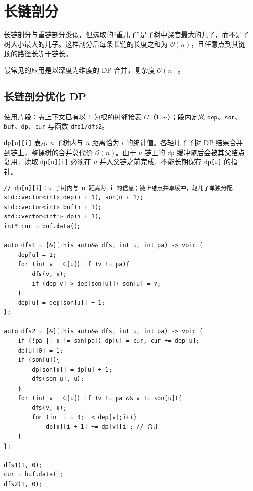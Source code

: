 \section{长链剖分}

长链剖分与重链剖分类似，但选取的“重儿子”是子树中深度最大的儿子，而不是子树大小最大的儿子。这样剖分后每条长链的长度之和为 $\mathcal{O}(n)$，且任意点到其链顶的路径长等于链长。

最常见的应用是以深度为维度的 DP 合并，复杂度 $\mathcal{O}(n)$。

\subsection{长链剖分优化 DP}

使用片段：需上下文已有以 $1$ 为根的树邻接表 $G$（$1..n$）；段内定义 \texttt{dep}、\texttt{son}、\texttt{buf}、\texttt{dp}、\texttt{cur} 与函数 \texttt{dfs1/dfs2}。

\texttt{dp[u][i]} 表示 $u$ 子树内与 $u$ 距离恰为 $i$ 的统计值。各轻儿子子树 DP 结果合并到链上，整棵树的合并总代价 $\mathcal{O}(n)$。由于 $u$ 链上的 \texttt{dp} 缓冲随后会被其父结点复用，读取 \texttt{dp[u][i]} 必须在 $u$ 并入父链之前完成，不能长期保存 \texttt{dp[u]} 的指针。

\begin{lstlisting}
// dp[u][i]：u 子树内与 u 距离为 i 的信息；链上结点共享缓冲，轻儿子单独分配
std::vector<int> dep(n + 1), son(n + 1);
std::vector<int> buf(n + 1);
std::vector<int*> dp(n + 1);
int* cur = buf.data();

auto dfs1 = [&](this auto&& dfs, int u, int pa) -> void {
    dep[u] = 1;
    for (int v : G[u]) if (v != pa){
        dfs(v, u);
        if (dep[v] > dep[son[u]]) son[u] = v;
    }
    dep[u] = dep[son[u]] + 1;
};

auto dfs2 = [&](this auto&& dfs, int u, int pa) -> void {
    if (!pa || u != son[pa]) dp[u] = cur, cur += dep[u];
    dp[u][0] = 1;
    if (son[u]){
        dp[son[u]] = dp[u] + 1;
        dfs(son[u], u);
    }
    for (int v : G[u]) if (v != pa && v != son[u]){
        dfs(v, u);
        for (int i = 0;i < dep[v];i++)
            dp[u][i + 1] += dp[v][i]; // 合并
    }
};

dfs1(1, 0);
cur = buf.data();
dfs2(1, 0);
\end{lstlisting}
